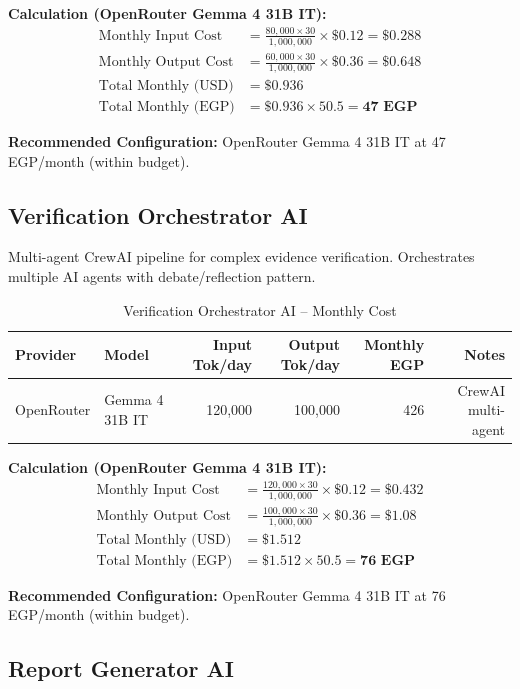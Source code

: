 \documentclass[11pt,a4paper]{article}
\begin{document}
\noindent\textbf{Calculation (OpenRouter Gemma 4 31B IT):}
\begin{align*}
\text{Monthly Input Cost} &= \frac{80{,}000 \times 30}{1{,}000{,}000} \times \$0.12 = \$0.288 \\
\text{Monthly Output Cost} &= \frac{60{,}000 \times 30}{1{,}000{,}000} \times \$0.36 = \$0.648 \\
\text{Total Monthly (USD)} &= \$0.936 \\
\text{Total Monthly (EGP)} &= \$0.936 \times 50.5 = \textbf{47 EGP}
\end{align*}

\textbf{Recommended Configuration:} OpenRouter Gemma 4 31B IT at 47 EGP/month (within budget).

\subsection{Verification Orchestrator AI}

Multi-agent CrewAI pipeline for complex evidence verification. Orchestrates multiple AI agents with debate/reflection pattern.

\begin{table}[H]
\centering
\begin{tabular}{|l|l|r|r|r|r|}
\hline
\textbf{Provider} & \textbf{Model} & \textbf{Input Tok/day} & \textbf{Output Tok/day} & \textbf{Monthly EGP} & \textbf{Notes} \\
\hline
OpenRouter & Gemma 4 31B IT & 120,000 & 100,000 & 426 & CrewAI multi-agent \\
\hline
\end{tabular}
\caption{Verification Orchestrator AI -- Monthly Cost}
\end{table}

\noindent\textbf{Calculation (OpenRouter Gemma 4 31B IT):}
\begin{align*}
\text{Monthly Input Cost} &= \frac{120{,}000 \times 30}{1{,}000{,}000} \times \$0.12 = \$0.432 \\
\text{Monthly Output Cost} &= \frac{100{,}000 \times 30}{1{,}000{,}000} \times \$0.36 = \$1.08 \\
\text{Total Monthly (USD)} &= \$1.512 \\
\text{Total Monthly (EGP)} &= \$1.512 \times 50.5 = \textbf{76 EGP}
\end{align*}

\textbf{Recommended Configuration:} OpenRouter Gemma 4 31B IT at 76 EGP/month (within budget).

\subsection{Report Generator AI}
\end{document}
